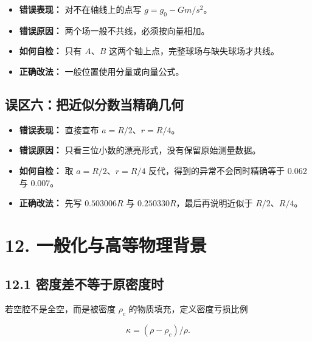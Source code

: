 \documentclass[
  11pt,
  UTF8]{ctexart}
\providecommand{\tightlist}{%
  \setlength{\itemsep}{0pt}\setlength{\parskip}{0pt}}
\begin{document}
\begin{itemize}
\tightlist
\item
  \textbf{错误表现：} 对不在轴线上的点写 \(g=g_0-Gm/s^2\)。
\item
  \textbf{错误原因：} 两个场一般不共线，必须按向量相加。
\item
  \textbf{如何自检：} 只有 \(A\)、\(B\)
  这两个轴上点，完整球场与缺失球场才共线。
\item
  \textbf{正确改法：} 一般位置使用分量或向量公式。
\end{itemize}

\hypertarget{ux8befux533aux516dux628aux8fd1ux4f3cux5206ux6570ux5f53ux7cbeux786eux51e0ux4f55}{%
\subsection{误区六：把近似分数当精确几何}\label{ux8befux533aux516dux628aux8fd1ux4f3cux5206ux6570ux5f53ux7cbeux786eux51e0ux4f55}}

\begin{itemize}
\tightlist
\item
  \textbf{错误表现：} 直接宣布 \(a=R/2\)、\(r=R/4\)。
\item
  \textbf{错误原因：} 只看三位小数的漂亮形式，没有保留原始测量数据。
\item
  \textbf{如何自检：} 取 \(a=R/2\)、\(r=R/4\)
  反代，得到的异常不会同时精确等于 0.062 与 0.007。
\item
  \textbf{正确改法：} 先写 \(0.503006R\) 与
  \(0.250330R\)，最后再说明近似于 \(R/2\)、\(R/4\)。
\end{itemize}

\hypertarget{ux4e00ux822cux5316ux4e0eux9ad8ux7b49ux7269ux7406ux80ccux666f}{%
\section{12.
一般化与高等物理背景}\label{ux4e00ux822cux5316ux4e0eux9ad8ux7b49ux7269ux7406ux80ccux666f}}

\hypertarget{ux5bc6ux5ea6ux5deeux4e0dux7b49ux4e8eux539fux5bc6ux5ea6ux65f6}{%
\subsection{12.1
密度差不等于原密度时}\label{ux5bc6ux5ea6ux5deeux4e0dux7b49ux4e8eux539fux5bc6ux5ea6ux65f6}}

若空腔不是全空，而是被密度 \(ρ_c\) 的物质填充，定义密度亏损比例

\[κ=(ρ-ρ_c)/ρ.\]
\end{document}
